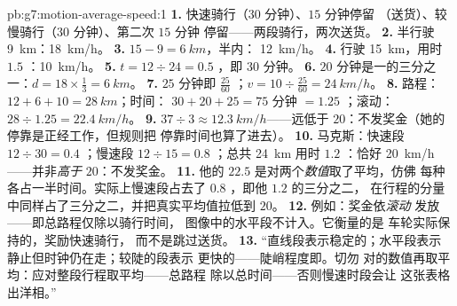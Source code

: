 \begin{solution}{pb:g7:motion-average-speed:1}
\textbf{1.} 快速骑行（$30$ 分钟）、$15$ 分钟停留
（送货）、较慢骑行（$30$ 分钟）、第二次 $15$ 分钟
停留——两段骑行，两次送货。
\textbf{2.} 半行驶 \qty{9}{km}：\qty{18}{km/h}。
\textbf{3.} $15 - 9 = \qty{6}{km}$，半内：
\qty{12}{km/h}。
\textbf{4.} 行驶 \qty{15}{km}，用时 $1.5$ ：\qty{10}{km/h}。
\textbf{5.} $t = 12 \div 24 = 0.5$ ，即 $30$ 分钟。
\textbf{6.} $20$ 分钟是一的三分之一：$d = 18 \times
\tfrac{1}{3} = \qty{6}{km}$。
\textbf{7.} $25$ 分钟即 $\tfrac{25}{60}$ ；$v = 10
\div \tfrac{25}{60} = \qty{24}{km/h}$。
\textbf{8.} 路程：$12 + 6 + 10 = \qty{28}{km}$；时间：
$30 + 20 + 25 = 75$ 分钟 $= 1.25$ ；滚动：
$28 \div 1.25 = \qty{22.4}{km/h}$。
\textbf{9.} $37 \div 3 \approx \qty{12.3}{km/h}$——远低于
$20$：不发奖金（她的停靠是正经工作，但规则把
停靠时间也算了进去）。
\textbf{10.} 马克斯：快速段 $12 \div 30 = 0.4$ ；慢速段
$12 \div 15 = 0.8$ ；总共 \qty{24}{km} 用时 $1.2$ ：恰好
\qty{20}{km/h}——并非\emph{高于} $20$：不发奖金。
\textbf{11.} 他的 $22.5$ 是对两个\emph{数值}取了平均，仿佛
每种各占一半时间。实际上慢速段占去了
$0.8$ ，即他 $1.2$ 的三分之二，
在行程的分量中同样占了三分之二，并把真实平均值拉低到 $20$。
\textbf{12.} 例如：奖金依\emph{滚动}
发放——即总路程仅除以骑行时间，
图像中的水平段不计入。它衡量的是
车轮实际保持的，奖励快速骑行，
而不是跳过送货。
\textbf{13.} “直线段表示稳定的；水平段表示
静止但时钟仍在走；较陡的段表示
更快的——陡峭程度即。切勿
对的数值再取平均：应对整段行程取平均——总路程
除以总时间——否则慢速时段会让
这张表格出洋相。”
\end{solution}
